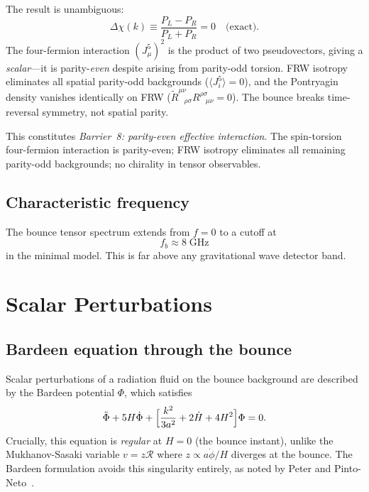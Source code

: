 \documentclass[aps,prd,twocolumn,superscriptaddress,showpacs,preprintnumbers,
  nofootinbib,longbibliography,floatfix]{revtex4-2}
\begin{document}
The result is unambiguous:
\begin{equation}\label{eq:chirality}
  \boxed{\Delta\chi(k) \equiv \frac{P_L - P_R}{P_L + P_R} = 0
  \quad \text{(exact)}.}
\end{equation}
The four-fermion interaction $(J^5_\mu)^2$ is the product of two
pseudovectors, giving a \textit{scalar}---it is parity-\textit{even}
despite arising from parity-odd torsion. FRW isotropy eliminates all
spatial parity-odd backgrounds ($\langle J^5_i\rangle = 0$), and the
Pontryagin density vanishes identically on FRW
($\tilde{R}^{\mu\nu}_{\;\;\;\rho\sigma}R^{\rho\sigma}_{\;\;\;\mu\nu}=0$).
The bounce breaks time-reversal symmetry, not spatial parity.

This constitutes \textit{Barrier~8: parity-even effective interaction}.
The spin-torsion four-fermion interaction is parity-even; FRW isotropy
eliminates all remaining parity-odd backgrounds; no chirality in tensor
observables.

\subsection{Characteristic frequency}

The bounce tensor spectrum extends from $f=0$ to a cutoff at
\begin{equation}\label{eq:fb_minimal}
  f_b \approx 8\;\text{GHz}
\end{equation}
in the minimal model. This is far above any gravitational wave detector
band.


\section{Scalar Perturbations}\label{sec:scalar}

\subsection{Bardeen equation through the bounce}

Scalar perturbations of a radiation fluid on the bounce background are
described by the Bardeen potential $\Phi$, which satisfies
\begin{equation}\label{eq:bardeen}
  \ddot\Phi + 5H\dot\Phi +
  \Bigl[\frac{k^2}{3a^2} + 2\dot H + 4H^2\Bigr]\Phi = 0.
\end{equation}
Crucially, this equation is \textit{regular} at $H=0$ (the bounce
instant), unlike the Mukhanov-Sasaki variable $v = z\mathcal{R}$ where
$z \propto a\dot\phi/H$ diverges at the bounce. The Bardeen formulation
avoids this singularity entirely, as noted by Peter and
Pinto-Neto~\cite{PeterPintoNeto2008}.
\end{document}
